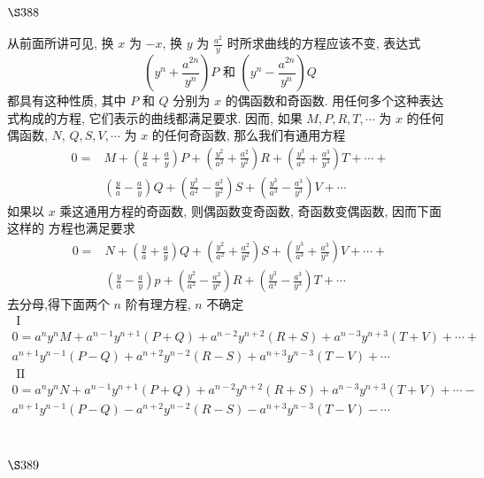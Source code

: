\section{$\S 388$}

从前面所讲可见, 换 $x$ 为 $-x$, 换 $y$ 为 $\frac{a^{2}}{y}$ 时所求曲线的方程应该不变, 表达式
\[
\left(y^{n}+\frac{a^{2 n}}{y^{n}}\right) P \text { 和 }\left(y^{n}-\frac{a^{2 n}}{y^{n}}\right) Q
\]
都具有这种性质, 其中 $P$ 和 $Q$ 分别为 $x$ 的偶函数和奇函数. 用任何多个这种表达式构成的方程, 它们表示的曲线都满足要求. 因而, 如果 $M, P, R, T, \cdots$ 为 $x$ 的任何偶函数, $N$, $Q, S, V, \cdots$ 为 $x$ 的任何奇函数, 那么我们有通用方程
\[
\begin{aligned}
0= & M+\left(\frac{y}{a}+\frac{a}{y}\right) P+\left(\frac{y^{2}}{a^{2}}+\frac{a^{2}}{y^{2}}\right) R+\left(\frac{y^{3}}{a^{3}}+\frac{a^{3}}{y^{3}}\right) T+\cdots+ \\
& \left(\frac{y}{a}-\frac{a}{y}\right) Q+\left(\frac{y^{2}}{a^{2}}-\frac{a^{2}}{y^{2}}\right) S+\left(\frac{y^{3}}{a^{3}}-\frac{a^{3}}{y^{3}}\right) V+\cdots
\end{aligned}
\]
如果以 $x$ 乘这通用方程的奇函数, 则偶函数变奇函数, 奇函数变偶函数, 因而下面这样的 方程也满足要求
\[
\begin{aligned}
0= & N+\left(\frac{y}{a}+\frac{a}{y}\right) Q+\left(\frac{y^{2}}{a^{2}}+\frac{a^{2}}{y^{2}}\right) S+\left(\frac{y^{3}}{a^{3}}+\frac{a^{3}}{y^{3}}\right) V+\cdots+ \\
& \left(\frac{y}{a}-\frac{a}{y}\right) p+\left(\frac{y^{2}}{a^{2}}-\frac{a^{2}}{y^{2}}\right) R+\left(\frac{y^{3}}{a^{3}}-\frac{a^{3}}{y^{3}}\right) T+\cdots
\end{aligned}
\]
去分母,得下面两个 $n$ 阶有理方程, $n$ 不确定
\[
\begin{gathered}
\text { I } \\
0=a^{n} y^{n} M+a^{n-1} y^{n+1}(P+Q)+a^{n-2} y^{n+2}(R+S)+a^{n-3} y^{n+3}(T+V)+\cdots+ \\
a^{n+1} y^{n-1}(P-Q)+a^{n+2} y^{n-2}(R-S)+a^{n+3} y^{n-3}(T-V)+\cdots \\
\text { II } \\
0=a^{n} y^{n} N+a^{n-1} y^{n+1}(P+Q)+a^{n-2} y^{n+2}(R+S)+a^{n-3} y^{n+3}(T+V)+\cdots- \\
a^{n+1} y^{n-1}(P-Q)-a^{n+2} y^{n-2}(R-S)-a^{n+3} y^{n-3}(T-V)-\cdots \\
\end{gathered}
\]
\section{$\S 389$}

